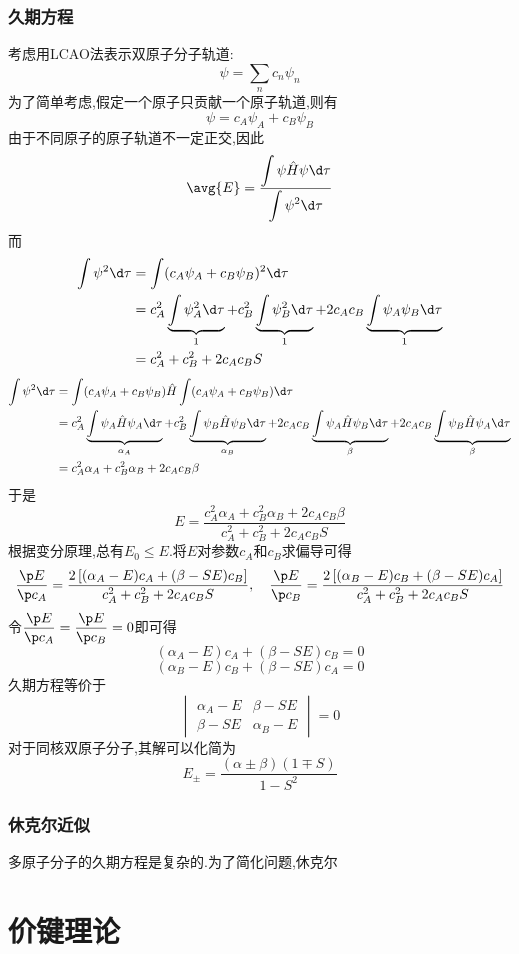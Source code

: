 \documentclass{ctexbook}
\begin{document}
\subsubsection{久期方程}
考虑用LCAO法表示双原子分子轨道:
\[\psi=\sum_{n}c_n\psi_n\]
为了简单考虑,假定一个原子只贡献一个原子轨道,则有
\[\psi=c_A\psi_A+c_B\psi_B\]
由于不同原子的原子轨道不一定正交,因此
\[\avg{E}=\dfrac{\displaystyle\int\psi\hat{H}\psi\d\tau}{\displaystyle\int\psi^2\d\tau}\]
而
\[\begin{aligned}
    \int\psi^2\d\tau
    &=\int(c_A\psi_A+c_B\psi_B)^2\d\tau\\
    &=c_A^2\underbrace{\int\psi_A^2\d\tau}_{1}+c_B^2\underbrace{\int\psi_B^2\d\tau}_{1}+2c_Ac_B\underbrace{\int\psi_A\psi_B\d\tau}_{1}\\
    &=c_A^2+c_B^2+2c_Ac_BS
\end{aligned}\]
\[\begin{aligned}
    \int\psi^2\d\tau
    &=\int(c_A\psi_A+c_B\psi_B)\hat{H}\int(c_A\psi_A+c_B\psi_B)\d\tau\\
    &=c_A^2\underbrace{\int\psi_A\hat{H}\psi_A\d\tau}_{\alpha_A}+c_B^2\underbrace{\int\psi_B\hat{H}\psi_B\d\tau}_{\alpha_B}+2c_Ac_B\underbrace{\int\psi_A\hat{H}\psi_B\d\tau}_{\beta}+2c_Ac_B\underbrace{\int\psi_B\hat{H}\psi_A\d\tau}_{\beta}\\
    &=c_A^2\alpha_A+c_B^2\alpha_B+2c_Ac_B\beta
\end{aligned}\]
于是
\[E=\dfrac{c_A^2\alpha_A+c_B^2\alpha_B+2c_Ac_B\beta}{c_A^2+c_B^2+2c_Ac_BS}\]
根据变分原理,总有$E_0\leq E$.将$E$对参数$c_A$和$c_B$求偏导可得
\[\dfrac{\p E}{\p c_A}=\dfrac{2\left[(\alpha_A-E)c_A+(\beta-SE)c_B\right]}{c_A^2+c_B^2+2c_Ac_BS},\quad\dfrac{\p E}{\p c_B}=\dfrac{2\left[(\alpha_B-E)c_B+(\beta-SE)c_A\right]}{c_A^2+c_B^2+2c_Ac_BS}\]
令$\dfrac{\p E}{\p c_A}=\dfrac{\p E}{\p c_B}=0$即可得
\[(\alpha_A-E)c_A+(\beta-SE)c_B=0\]
\[(\alpha_B-E)c_B+(\beta-SE)c_A=0\]
久期方程等价于
\[\begin{vmatrix}
    \alpha_A-E&\beta-SE\\
    \beta-SE&\alpha_B-E
\end{vmatrix}=0\]
对于同核双原子分子,其解可以化简为
\[E_\pm=\dfrac{(\alpha\pm\beta)(1\mp S)}{1-S^2}\]
\subsubsection{休克尔近似}
多原子分子的久期方程是复杂的.为了简化问题,休克尔
\section{价键理论}
\end{document}
